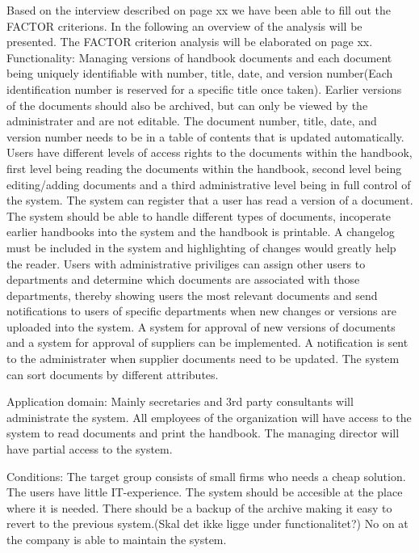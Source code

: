Based on the interview described on page xx we have been able to fill out the FACTOR criterions. In the following an overview of the analysis will be presented. The FACTOR criterion analysis will be elaborated on page xx.
Functionality: Managing versions of handbook documents and each document being uniquely identifiable with number, title, date, and version number(Each identification number is reserved for a specific title once taken). Earlier versions of the documents should also be archived, but can only be viewed by the administrater and are not editable.
The document number, title, date, and version number needs to be in a table of contents that is updated automatically.
Users have different levels of access rights to the documents within the handbook, first level being reading the documents within the handbook, second level being editing/adding documents and a third administrative level being in full control of the system.
The system can register that a user has read a version of a document.
The system should be able to handle different types of documents, incoperate earlier handbooks into the system and the handbook is printable.
A changelog must be included in the system and highlighting of changes would greatly help the reader.
Users with administrative priviliges can assign other users to departments and determine which documents are associated with those departments, thereby showing users the most relevant documents and send notifications to users of specific departments when new changes or versions are uploaded into the system.
A system for approval of new versions of documents and a system for approval of suppliers can be implemented.
A notification is sent to the administrater when supplier documents need to be updated. The system can sort documents by different attributes.

Application domain: Mainly secretaries and 3rd party consultants will administrate the system. All employees of the organization will have access to the system to read documents and print the handbook. The managing director will have partial access to the system.

Conditions: The target group consists of small firms who needs a cheap
solution. The users have little IT-experience. The system should be accesible at the place where it is needed.
There should be a backup of the archive making it easy to revert to the previous system.(Skal det ikke ligge under functionalitet?)
No on at the company is able to maintain the system.

